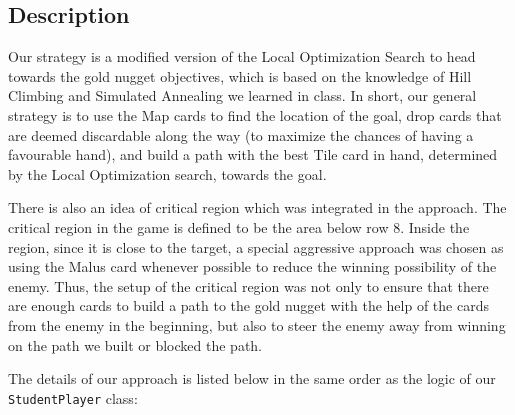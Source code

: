 \documentclass[12pt,twoside,letterpaper]{article}
\begin{document}
\subsection{Description}
Our strategy is a modified version of the Local Optimization Search to head towards the gold nugget objectives, which is based on the knowledge of Hill Climbing and Simulated Annealing we learned in class. In short, our general strategy is to use the Map cards to find the location of the goal, drop cards that are deemed discardable along the way (to maximize the chances of having a favourable hand), and build a path with the best Tile card in hand, determined by the Local Optimization search, towards the goal.
\par There is also an idea of critical region which was integrated in the approach. The critical region in the game is defined to be the area below row 8. Inside the region, since it is close to the target, a special aggressive approach was chosen as using the Malus card whenever possible to reduce the winning possibility of the enemy. Thus, the setup of the critical region was not only to ensure that there are enough cards to build a path to the gold nugget with the help of the cards from the enemy in the beginning, but also to steer the enemy away from winning on the path we built or blocked the path.
\newpage
\par The details of our approach is listed below in the same order as the logic of our \texttt{StudentPlayer} class:
\end{document}

